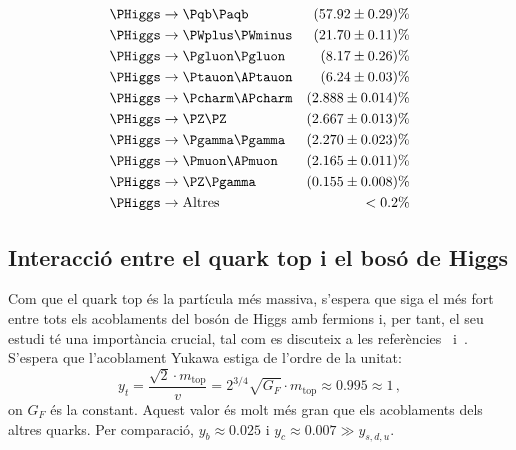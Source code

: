 \begin{minipage}[t]{0.4\textwidth}
  \centering{}
\end{minipage}\hfill
\begin{minipage}[t]{0.6\textwidth}
\begin{flushleft}
\begin{align*}
	\PHiggs &\rightarrow  \bbbar 			& (57.92 \pm 0.29)\% \\
	\PHiggs &\rightarrow  \PWplus\PWminus	& (21.70 \pm 0.11)\% \\
	\PHiggs &\rightarrow  \Pgluon \Pgluon 	& (8.17 \pm 0.26)\% \\ 
	\PHiggs &\rightarrow  \Ptauon\APtauon	& (6.24 \pm 0.03)\% \\
	\PHiggs &\rightarrow  \Pcharm \APcharm	& (2.888 \pm 0.014)\% \\ 
	\PHiggs &\rightarrow  \PZ\PZ			& (2.667 \pm 0.013)\% \\  
	\PHiggs &\rightarrow  \Pgamma \Pgamma	& (2.270 \pm 0.023)\% \\ 
	\PHiggs &\rightarrow  \Pmuon\APmuon	& (2.165 \pm 0.011)\% \\  
	\PHiggs &\rightarrow  \PZ \Pgamma		& (0.155 \pm 0.008)\% \\
	\PHiggs &\rightarrow \text{Altres}			& < 0.2 \%
\end{align*}
\end{flushleft}
\end{minipage}



\subsection{Interacció entre el quark top i el bosó de Higgs}
Com que el quark top és la partícula més massiva, s'espera que \yt siga el més fort entre tots els acoblaments 
del bosón de Higgs amb fermions i, per tant, 
el seu estudi té una importància crucial, tal com es discuteix a les referències~\cite{Farina:2012xp} 
i~\cite{Biswas:2012bd}. S'espera que l'acoblament Yukawa estiga de l'ordre de la unitat:
\begin{equation*}
y_t = \frac{\sqrt{2} \cdot m_{\text{top}}}{v} = 2^{3/4} \sqrt{G_F} \cdot m_{\text{top}} \approx 0.995 \approx 1 \, ,
\end{equation*}
on $G_{F}$ és la constant. Aquest valor és molt més gran que els acoblaments dels altres quarks. 
Per comparació, $y_b \approx 0.025$ i $y_c \approx 0.007 \gg y_{s,d,u}$.

